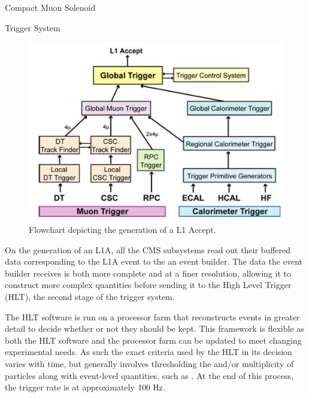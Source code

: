 \begin{section}{Compact Muon Solenoid}
\begin{subsection}{Trigger System}
\begin{figure}[tbp!]
\begin{center}
\includegraphics[angle=0,width=0.80\columnwidth]{fig/cms_trigger.png}
\end{center}
\caption{Flowchart depicting the generation of a L1 Accept.~\cite{1748-0221-3-08-S08004}}
\label{fig:cms_trigger}
\end{figure}

On the generation of an L1A, all the CMS subsystems read out their buffered data corresponding to the L1A event to the an event builder.
The data the event builder receives is both more complete and at a finer resolution, allowing it to construct more complex quantities before sending it to the High Level Trigger (HLT), the second stage of the trigger system.

The HLT software is run on a processor farm that reconstructs events in greater detail to decide whether or not they should be kept.
This framework is flexible as both the HLT software and the processor farm can be updated to meet changing experimental needs.
As such the exact criteria used by the HLT in its decision varies with time, but generally involves thresholding the \pT and/or multiplicity of particles along with event-level quantities, such as \HT.
At the end of this process, the trigger rate is at approximately $100~\mathrm{Hz}$.

\end{subsection}

\end{section}

